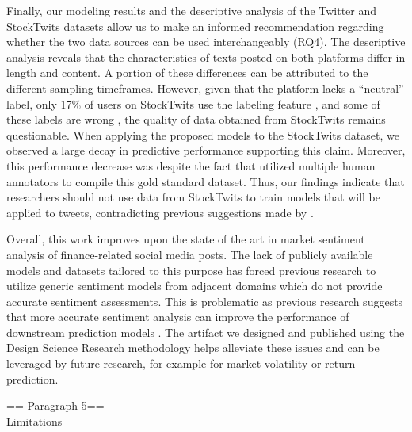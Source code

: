 Finally, our modeling results and the descriptive analysis of the Twitter and StockTwits datasets allow us to make an informed recommendation regarding whether the two data sources can be used interchangeably (RQ4). The descriptive analysis reveals that the characteristics of texts posted on both platforms differ in length and content. A portion of these differences can be attributed to the different sampling timeframes. However, given that the platform lacks a ``neutral'' label, only 17\% of users on StockTwits use the labeling feature , and some of these labels are wrong , the quality of data obtained from StockTwits remains questionable. When applying the proposed models to the StockTwits dataset, we observed a large decay in predictive performance supporting this claim. Moreover, this performance decrease was despite the fact that  utilized multiple human annotators to compile this gold standard dataset. Thus, our findings indicate that researchers should not use data from StockTwits to train models that will be applied to tweets, contradicting previous suggestions made by .


Overall, this work improves upon the state of the art in market sentiment analysis of finance-related social media posts. The lack of publicly available models and datasets tailored to this purpose has forced previous research to utilize generic sentiment models from adjacent domains which do not provide accurate sentiment assessments. This is problematic as previous research suggests that more accurate sentiment analysis can improve the performance of downstream prediction models . The artifact we designed and published using the Design Science Research methodology helps alleviate these issues and can be leveraged by future research, for example for market volatility or return prediction.

== Paragraph 5==\\
Limitations











